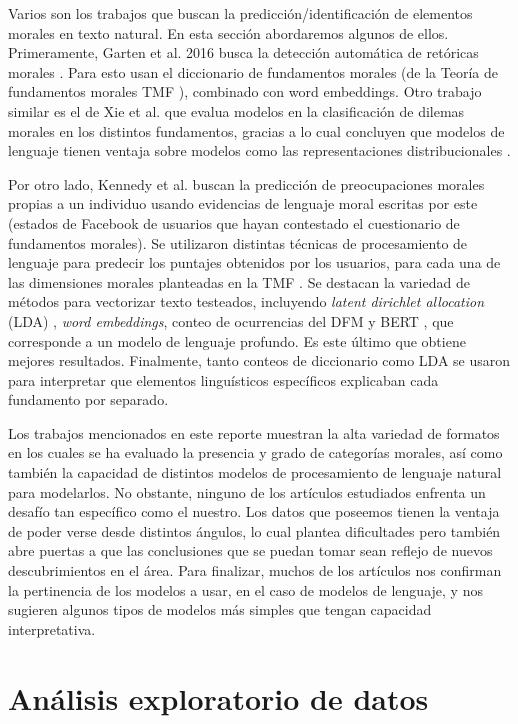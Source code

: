\documentclass[
	spanish, %
	letterpaper, oneside
]{article}
\begin{document}
\newp Varios son los trabajos que buscan la predicción/identificación de elementos morales en texto natural. En esta sección abordaremos algunos de ellos. Primeramente, Garten et al. 2016 busca la detección automática de retóricas morales \cite{garten}. Para esto usan el diccionario de fundamentos morales \cite{tfd} (de la Teoría de fundamentos morales TMF \cite{tmf}), combinado con {word embeddings}. Otro trabajo similar es el de Xie et al. que evalua modelos en la clasificación de dilemas morales en los distintos fundamentos, gracias a lo cual concluyen que modelos de lenguaje tienen ventaja sobre modelos como las representaciones distribucionales \cite{xie}.


\newp Por otro lado, Kennedy et al. buscan la predicción de preocupaciones morales propias a un individuo usando evidencias de lenguaje moral escritas por este \cite{diff} (estados de Facebook de usuarios que hayan contestado el cuestionario de fundamentos morales). Se utilizaron distintas técnicas de procesamiento de lenguaje para predecir los puntajes obtenidos por los usuarios, para cada una de las dimensiones morales planteadas en la TMF \cite{tmf}. Se destacan la variedad de métodos para vectorizar texto testeados, incluyendo \textit{latent dirichlet allocation} (LDA) \cite{lda}, \textit{word embeddings}, conteo de ocurrencias del DFM \cite{tfd} y BERT \cite{bert}, que corresponde a un modelo de lenguaje profundo. Es este último que obtiene mejores resultados. Finalmente, tanto conteos de diccionario como LDA se usaron para interpretar que elementos linguísticos específicos explicaban cada fundamento por separado.


\newp Los trabajos mencionados en este reporte muestran la alta variedad de formatos en los cuales se ha evaluado la presencia y grado de categorías morales, así como también la capacidad de distintos modelos de procesamiento de lenguaje natural para modelarlos. No obstante, ninguno de los artículos estudiados enfrenta un desafío tan específico como el nuestro. Los datos que poseemos tienen la ventaja de poder verse desde distintos ángulos, lo cual plantea dificultades pero también abre puertas a que las conclusiones que se puedan tomar sean reflejo de nuevos descubrimientos en el área. Para finalizar, muchos de los artículos nos confirman la pertinencia de los modelos a usar, en el caso de modelos de lenguaje, y nos sugieren algunos tipos de modelos más simples que tengan capacidad interpretativa.


\section{Análisis exploratorio de datos}
\end{document}

